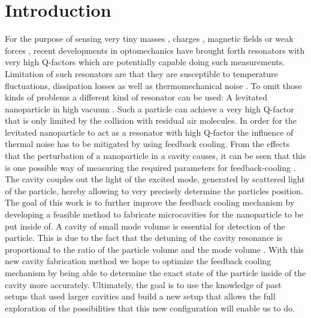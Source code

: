 \chapter{Introduction}
For the purpose of sensing very tiny masses \cite{chaste2012nanomechanical, yang2006zeptogram}, charges \cite{cleland1998nanometre}, magnetic fields \cite{rugar2004single} or weak forces \cite{stipe2001noncontact, moser2013ultrasensitive}, recent developments in optomechanics \cite{arndt2014testing, aspelmeyer2012quantum, aspelmeyer2014cavity} have brought forth resonators with very high Q-factors which are potentially capable doing such measurements. Limitation of such resonators are that they are susceptible to temperature fluctuations, dissipation losses as well as thermomechanical noise \cite{ekinci2004ultimate, aspelmeyer2012quantum, postma2005dynamic}. To omit those kinds of problems a different kind of resonator can be used: A levitated nanoparticle in high vacuum \cite{gieseler2013thermal}. Such a particle can achieve a very high Q-factor that is only limited by the collision with residual air molecules. In order for the levitated nanoparticle to act as a resonator with high Q-factor the influence of thermal noise has to be mitigated by using feedback cooling. From the effects that the perturbation of a nanoparticle in a cavity causes, it can be seen that this is one possible way of measuring the required parameters for feedback-cooling \cite{tanjiinteraction, chang2010cavity}. The cavity couples out the light of the excited mode, generated by scattered light of the particle, hereby allowing to very precisely determine the particles position.\\
The goal of this work is to further improve the feedback cooling mechanism by developing a feasible method to fabricate microcavities for the nanoparticle to be put inside of. A cavity of small mode volume is essential for detection of the particle. This is due to the fact that the detuning of the cavity resonance is proportional to the ratio of the particle volume and the mode volume \cite{chang2010cavity}. With this new cavity fabrication method we hope to optimize the feedback cooling mechanism by being able to determine the exact state of the particle inside of the cavity more accurately. Ultimately, the goal is to use the knowledge of past setups that used larger cavities and build a new setup that allows the full exploration of the possibilities that this new configuration will enable us to do.







